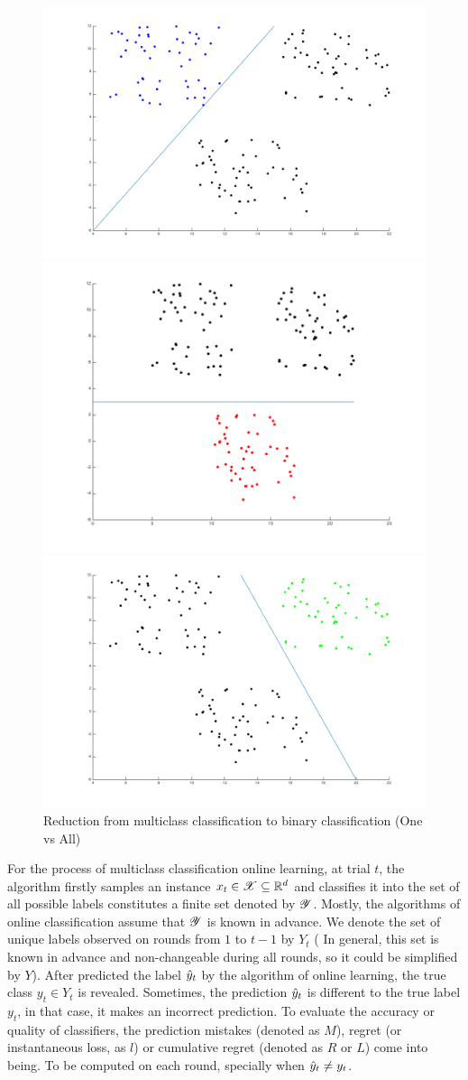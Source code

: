 \begin{figure}[!h]
\vspace{.2in}
\centerline{
\includegraphics[width=0.6\linewidth]{chapters/chapter03/fig03/mc/class1.png}}
\centerline{
\includegraphics[width=0.6\linewidth]{chapters/chapter03/fig03/mc/class2.png}}
\centerline{
\includegraphics[width=0.6\linewidth]{chapters/chapter03/fig03/mc/class3.png}}
\caption{Reduction from multiclass classification to binary classification (One vs All)} 
\label{pig:multiclass123}
\end{figure}

For the process of multiclass classification online learning, at trial $t$, the algorithm firstly samples an instance $x_t \in \mathscr{X}\subseteq \mathbb{R}^d$ and classifies it into the set of all possible labels constitutes a finite set denoted by $\mathscr{Y}$. Mostly, the algorithms of online classification assume that $\mathscr{Y}$ is known in advance. We denote the set of unique labels observed on rounds from $1$ to $t-1$ by $Y_t$ ( In general, this set is known in advance and non-changeable during all rounds, so it could be simplified by $Y$). After predicted the label $\hat{y}_t$ by the algorithm of online learning, the true class $y_t\in Y_t$ is revealed. Sometimes, the prediction $\hat{y}_t$ is different to the true label $y_t$, in that case, it makes an incorrect prediction. To evaluate the accuracy or quality of classifiers, the prediction mistakes (denoted as $M$), regret (or instantaneous loss, as $l$) or cumulative regret (denoted as $R$ or $L$) come into being. To be computed on each round, specially when $\hat{y}_t \neq y_t$.

